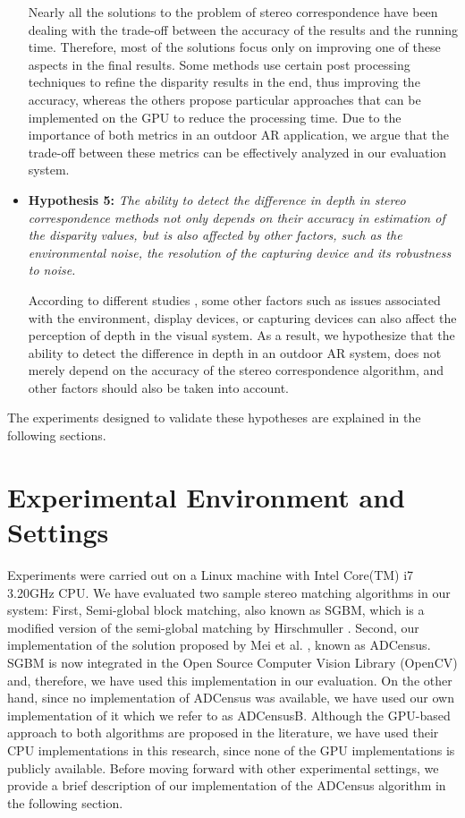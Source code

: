 \begin{itemize}
Nearly all the solutions to the problem of stereo correspondence have been dealing with the trade-off between the accuracy of the results and the running time.
Therefore, most of the solutions focus only on improving one of these aspects in the final results. Some methods use certain post processing techniques to refine the 
disparity results in the end, thus improving the accuracy, whereas the others propose particular approaches that can be implemented on the GPU to reduce the processing time.
Due to the importance of both metrics in an outdoor AR application, we argue that the trade-off between these metrics can be effectively analyzed in our evaluation system.

\item \textbf{Hypothesis 5:} \emph{The ability to detect the difference in depth in stereo correspondence methods not only depends on their accuracy
in estimation of the disparity values, but is also affected by other factors, such as the environmental noise, the resolution of the capturing device and its
robustness to noise.}

According to different studies \cite{dras96, kru10,azuma01}, some other factors such as issues associated with the environment, display devices, or capturing devices
can also affect the perception of depth in the visual system. As a result, we hypothesize that the ability to detect the difference in depth in an outdoor AR system,
does not merely depend on the accuracy of the stereo correspondence algorithm, and other factors should also be taken into account.
\end{itemize}
\noindent
The experiments designed to validate these hypotheses are explained in the following sections.

\section{Experimental Environment and Settings}
Experiments were carried out on a Linux machine with Intel Core(TM) i7 3.20GHz CPU. 
We have evaluated two sample stereo matching algorithms in our system: First, Semi-global block matching, also known as SGBM, which is a modified version 
of the semi-global matching by Hirschmuller \cite{hir08}. Second, our implementation of the solution proposed by Mei et al. \cite{mei11}, known as ADCensus. \newline
SGBM is now integrated in the Open Source Computer Vision Library (OpenCV) \cite{sgbm} and, therefore, we have used this implementation
in our evaluation.
On the other hand, since no implementation of ADCensus was available, we have used our own implementation of it 
which we refer to as ADCensusB.
Although the GPU-based approach to both algorithms are proposed in the literature,
we have used their CPU implementations in this research, since none of the GPU implementations is publicly available.
Before moving forward with other experimental settings, we provide a brief description of our implementation of the ADCensus algorithm in the following section.

